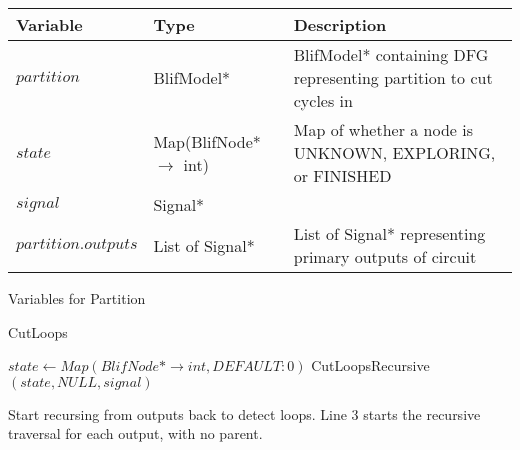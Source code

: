 \documentclass[12pt,final,oneside]{article} %
\begin{document}
\begin{algorithm}
    \begin{center}
        \begin{tabularx}{\linewidth}{llX}
        \toprule
        Variable & Type & Description\\
        \midrule
        $partition$ & BlifModel* & BlifModel* containing DFG representing partition to cut cycles in\\
        $state$ & Map(BlifNode* $\to$ int) & Map of whether a node is UNKNOWN, EXPLORING, or FINISHED\\
        $signal$ & Signal* & \\
        $partition.outputs$ & List of Signal* & List of Signal* representing primary outputs of circuit\\
        \bottomrule
        \end{tabularx}
        \caption{Variables for Partition}
        \label{varPart}
    \end{center}
   \caption{CutLoops}\label{main}
   \begin{algorithmic}[1]
            \State $state \gets Map(BlifNode* \to int, DEFAULT: 0)$
               \State CutLoopsRecursive$(state, NULL, signal)$
            \EndFor
         \EndProcedure
   \end{algorithmic}
\end{algorithm}
Start recursing from outputs back to detect loops.
Line 3 starts the recursive traversal for each output, with no parent.

\newpage
\end{document}
